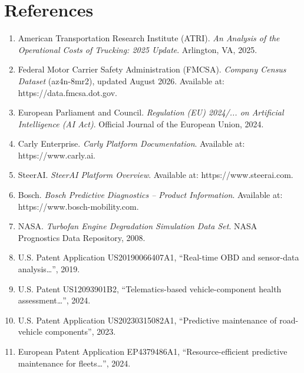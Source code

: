 \documentclass[11pt,a4paper]{article}
\begin{document}
\newpage
\section*{References}

\begin{enumerate}
    \item American Transportation Research Institute (ATRI). \emph{An Analysis of the Operational Costs of Trucking: 2025 Update}. Arlington, VA, 2025.
    
    \item Federal Motor Carrier Safety Administration (FMCSA). \emph{Company Census Dataset} (az4n-8mr2), updated August 2026. Available at: https://data.fmcsa.dot.gov.
    
    \item European Parliament and Council. \emph{Regulation (EU) 2024/... on Artificial Intelligence (AI Act)}. Official Journal of the European Union, 2024.
    
    \item Carly Enterprise. \emph{Carly Platform Documentation}. Available at: https://www.carly.ai.
    
    \item SteerAI. \emph{SteerAI Platform Overview}. Available at: https://www.steerai.com.
    
    \item Bosch. \emph{Bosch Predictive Diagnostics – Product Information}. Available at: https://www.bosch-mobility.com.
    
    \item NASA. \emph{Turbofan Engine Degradation Simulation Data Set}. NASA Prognostics Data Repository, 2008.
    \item U.S. Patent Application US20190066407A1, “Real-time OBD and sensor-data analysis…”, 2019.
    \item U.S. Patent US12093901B2, “Telematics-based vehicle-component health assessment…”, 2024.
    \item U.S. Patent Application US20230315082A1, “Predictive maintenance of road-vehicle components”, 2023.
    \item European Patent Application EP4379486A1, “Resource-efficient predictive maintenance for fleets…”, 2024.

\end{enumerate}
\end{document}
